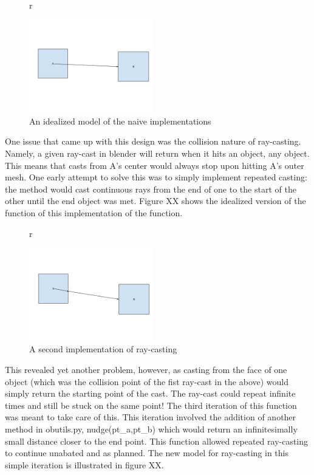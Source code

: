 \begin{figure}{r}
	\begin{center}
		\includegraphics[width=0.48\textwidth]{figures/vision1.png}
	\end{center}
	\caption{An idealized model of the naive implementations}
\end{figure}

One issue that came up with this design was the collision nature of ray-casting. Namely, a given ray-cast in blender will return when it hits an object, any object. This means that casts from A's center would always stop upon hitting A's outer mesh. One early attempt to solve this was to simply implement repeated casting: the method would cast continuous rays from the end of one to the start of the other until the end object was met. Figure XX shows the idealized version of the function of this implementation of the function.

\begin{figure}{r}
	\begin{center}
		\includegraphics[width=0.48\textwidth]{figures/vision2.png}
	\end{center}
	\caption{A second implementation of ray-casting}
\end{figure}

This revealed yet another problem, however, as casting from the face of one object (which was the collision point of the fist ray-cast in the above) would simply return the starting point of the cast. The ray-cast could repeat infinite times and still be stuck on the same point! The third iteration of this function was meant to take care of this. This iteration involved the addition of another method in obutils.py, nudge(pt\_a,pt\_b) which would return an infinitesimally small distance closer to the end point. This function allowed repeated ray-casting to continue unabated and as planned. The new model for ray-casting in this simple iteration is illustrated in figure XX. 

